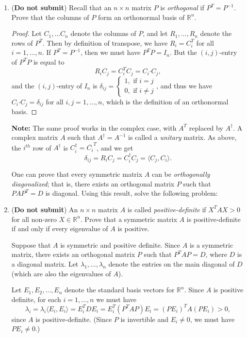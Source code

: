 \documentclass[letterpaper,12pt]{article}
\newcommand{\R}{\mathbb{R}}
\newcommand{\dotp}{\boldsymbol{\cdot}}
\begin{document}
\begin{enumerate}
 \item ({\bf Do not submit}) Recall that an $n\times n$ matrix $P$ is {\em orthogonal} if $P^T = P^{-1}$. Prove that the columns of $P$ form an orthonormal basis of $\R^n$.

\bigskip

\begin{proof}
 Let $C_1,\ldots C_n$ denote the columns of $P$, and let $R_1,\ldots, R_n$ denote the rows of $P^T$. Then by definition of transpose, we have $R_i=C_i^T$ for all $i=1,\ldots, n$. If $P^T=P^{-1}$, then we must have $P^TP=I_n$. But the $(i,j)$-entry of $P^TP$ is equal to
\[
 R_iC_j = C_i^TC_j = C_i\dotp C_j,
\]
and the $(i,j)$-entry of $I_n$ is $\delta_{ij} = \begin{cases} 1, \text{ if } i=j\\ 0, \text{ if } i\neq j\end{cases}$, and thus we have $C_i\dotp C_j = \delta_{ij}$ for all $i,j=1,\ldots, n$, which is the definition of an orthonormal basis.
\end{proof}
{\bf Note:} The same proof works in the complex case, with $A^T$ replaced by $A^\dagger$. A complex matrix $A$ such that $A^\dagger = A^{-1}$ is called a {\em unitary} matrix. As above, the $i^{th}$ row of $A^\dagger$ is $C_i^\dagger = \overline{C_i}^T$, and we get
\[
 \delta_{ij} = R_iC_j = C_i^\dagger C_j = \langle C_j,C_i\rangle.
\]


 
One can prove that every symmetric matrix $A$ can be {\em orthogonally diagonalized}; that is, there exists an orthogonal matrix $P$ such that $PAP^T=D$ is diagonal. Using this result, solve the following problem:

 \item ({\bf Do not submit}) An $n\times n$ matrix $A$ is called {\em positive-definite} if $X^TAX> 0$ for all non-zero $X\in \R^n$. Prove that a symmetric matrix $A$ is positive-definite if and only if every eigenvalue of $A$ is positive.

\bigskip

Suppose that $A$ is symmetric and positive definite. Since $A$ is a symmetric matrix, there exists an orthogonal matrix $P$ such that $P^TAP=D$, where $D$ is a diagonal matrix. Let $\lambda_1,\ldots, \lambda_n$ denote the entries on the main diagonal of $D$ (which are also the eigenvalues of $A$).

Let $E_1,E_2,\ldots, E_n$ denote the standard basis vectors for $\R^n$. Since $A$ is positive definite, for each $i=1,\ldots, n$ we must have
\[
 \lambda_i = \lambda_i\langle E_i,E_i\rangle = E_i^TDE_i = E_i^T(P^TAP)E_i = (PE_i)^TA(PE_i)>0,
\]
since $A$ is positive-definite. (Since $P$ is invertible and $E_i\neq 0$, we must have $PE_i\neq 0$.)


\end{enumerate}
\end{document}
